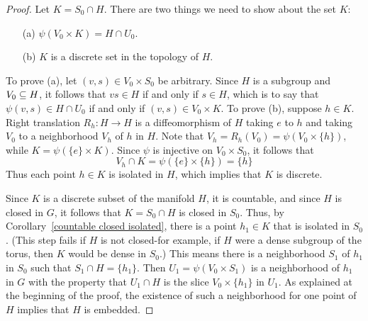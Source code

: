 \begin{proof}
Let $K=S_0\cap H$. There are two things we need to show about the set $K$:
\begin{itemize}
\item[(a)] $\psi(V_0\times K)=H\cap U_0$.
\item[(b)] $K$ is a discrete set in the topology of $H$.
\end{itemize}
To prove (a), let $(v,s)\in V_0\times S_0$ be arbitrary. Since $H$ is a subgroup and $V_0\subseteq H$, it follows that $vs\in H$ if and only if $s\in H$, which is to say that $\psi(v,s)\in H\cap U_0$ if and only if $(v,s)\in V_0\times K$. To prove (b), suppose $h\in K$. Right translation $R_h:H\to H$ is a diffeomorphism of $H$ taking $e$ to $h$ and taking $V_0$ to a neighborhood $V_h$ of $h$ in $H$. Note that $V_h=R_h(V_0)=\psi(V_0\times\{h\})$, while $K=\psi(\{e\}\times K)$. Since $\psi$ is injective on $V_0\times S_0$, it follows that
\[V_h\cap K=\psi(\{e\}\times\{h\})=\{h\}\]
Thus each point $h\in K$ is isolated in $H$, which implies that $K$ is discrete.\par
Since $K$ is a discrete subset of the manifold $H$, it is countable, and since $H$ is closed in $G$, it follows that $K=S_0\cap H$ is closed in $S_0$. Thus, by Corollary~\ref{countable closed isolated}, there is a point $h_1\in K$ that is isolated in $S_0$. (This step fails if $H$ is not closed-for example, if $H$ were a dense subgroup of the torus, then $K$ would be dense in $S_0$.) This means there is a neighborhood $S_1$ of $h_1$ in $S_0$ such that $S_1\cap H=\{h_1\}$. Then $U_1=\psi(V_0\times S_1)$ is a neighborhood of $h_1$ in $G$ with the property that $U_1\cap H$ is the slice $V_0\times\{h_1\}$ in $U_1$. As explained at the beginning of the proof, the existence of such a neighborhood for one point of $H$ implies that $H$ is embedded.
\end{proof}
